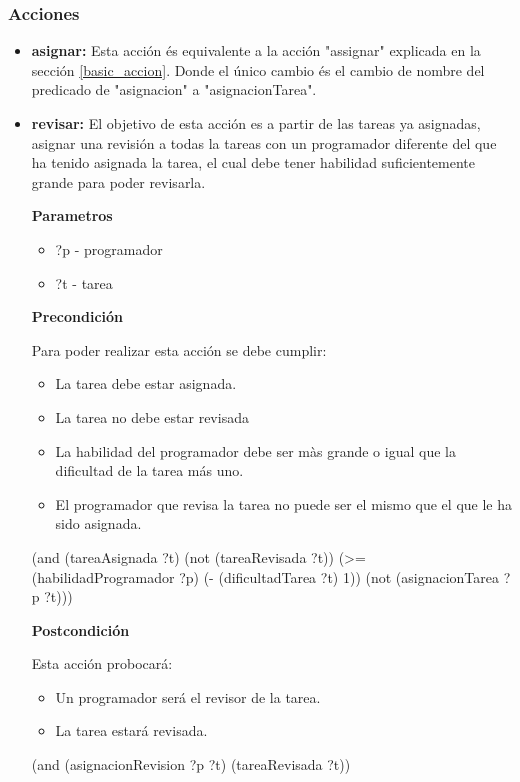 \documentclass[12pt]{article}
\begin{document}
\subsubsection{Acciones}

\begin{itemize}
  \item \textbf{asignar:} Esta acción és equivalente a la acción "assignar" explicada en la sección \ref{basic_accion}. Donde el único cambio és el cambio de nombre del predicado de "asignacion" a "asignacionTarea".
  \item \textbf{revisar:} El objetivo de esta acción es a partir de las tareas ya asignadas, asignar una revisión a todas la tareas con un programador diferente del que ha tenido asignada la tarea, el cual debe tener habilidad suficientemente grande para poder revisarla.
  
  \textbf{Parametros}
  \begin{itemize}
  	\item ?p - programador
  	\item ?t - tarea
  \end{itemize}
  
  \textbf{Precondición}
  
  Para poder realizar esta acción se debe cumplir:
  \begin{itemize}
  	\item La tarea debe estar asignada.
  	\item La tarea no debe estar revisada
  	\item La habilidad del programador debe ser màs grande o igual que la dificultad de la tarea más uno.
  	\item El programador que revisa la tarea no puede ser el mismo que el que le ha sido asignada.
  \end{itemize}
  
  (and (tareaAsignada ?t) (not (tareaRevisada ?t)) (>= (habilidadProgramador ?p) (- (dificultadTarea ?t) 1)) (not (asignacionTarea ?p ?t)))
  
  \textbf{Postcondición}
  
  Esta acción probocará:
  \begin{itemize}
  	\item Un programador será el revisor de la tarea.
  	\item La tarea estará revisada.
  \end{itemize}
  
  (and (asignacionRevision ?p ?t) (tareaRevisada ?t))
  
\end{itemize}
\end{document}
